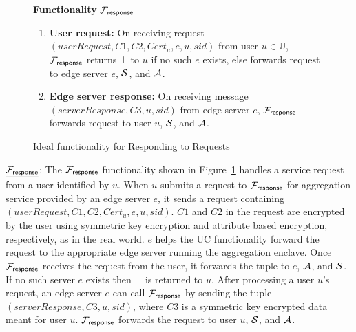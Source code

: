 \begin{figure}[h]
\vspace{-0.0in}
\begin{mdframed}
\begin{center}
\textbf{Functionality} $\mathcal{F}_{\mathsf{response}}$
\end{center}
\begin{enumerate}%


\item \textbf{User request:} On receiving request $(userRequest,C1,C2,Cert_{u},e,u,sid)$ from user $u \in \mathbb{U}$, $\mathcal{F}_{\mathsf{response}}$ returns $\bot$ to $u$ if no such $e$ exists, else forwards request to edge server $e$, $\mathcal{S}$, and $\mathcal{A}$. %

\item \textbf{Edge server response:} On receiving message $(serverResponse,C3,u,sid)$ from edge server $e$, $\mathcal{F}_{\mathsf{response}}$ forwards request to user $u$, $\mathcal{S}$, and $\mathcal{A}$. 









 



\end{enumerate}
\end{mdframed}
\vspace{-0.15in}
\caption{Ideal functionality for Responding to Requests}
\label{fig:ucresponse}
\end{figure}








 





$\underline{\mathcal{F}_{\mathsf{response}}}$: %
The $\mathcal{F}_{\mathsf{response}}$ functionality shown in Figure~\ref{fig:ucresponse} handles a service request from a user identified by $u$. When $u$ submits a request to $\mathcal{F}_{\mathsf{response}}$ for aggregation service provided by an edge server $e$, it sends a request containing $(userRequest,C1,C2,Cert_{u},e,u,sid)$. %
$C1$ and $C2$ in the request are encrypted by the user using symmetric key encryption and attribute based encryption, respectively, as in the real world. $e$ helps the UC functionality forward the request to the appropriate edge server running the aggregation enclave.
Once $\mathcal{F}_{\mathsf{response}}$ receives the request from the user, it forwards the tuple to $e$, $\mathcal{A}$, and $\mathcal{S}$. If no such server $e$ exists then $\bot$ is returned to $u$. 
After processing a user $u$'s request, an edge server $e$ can call $\mathcal{F}_{\mathsf{response}}$ by sending the tuple $(serverResponse,C3,u,sid)$, where $C3$ is a symmetric key encrypted data meant for user $u$. $\mathcal{F}_{\mathsf{response}}$ forwards the request to user $u$, $\mathcal{S}$, and $\mathcal{A}$.

